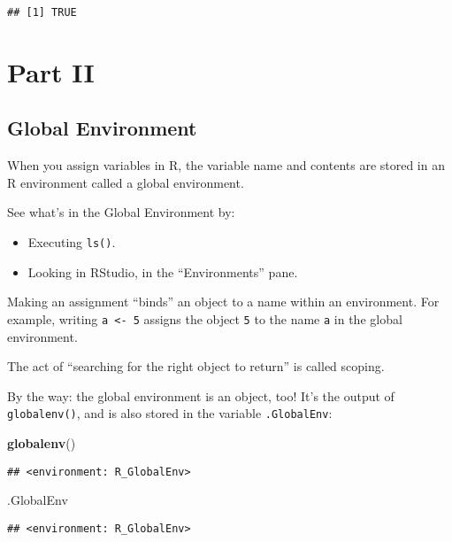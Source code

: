 \documentclass[]{article}
\newenvironment{Shaded}{\begin{snugshade}}{\end{snugshade}}
\newcommand{\KeywordTok}[1]{\textcolor[rgb]{0.13,0.29,0.53}{\textbf{#1}}}
\newcommand{\NormalTok}[1]{#1}
\providecommand{\tightlist}{%
  \setlength{\itemsep}{0pt}\setlength{\parskip}{0pt}}
\begin{document}
\begin{verbatim}
## [1] TRUE
\end{verbatim}

\section{Part II}\label{part-ii}

\subsection{Global Environment}\label{global-environment}

When you assign variables in R, the variable name and contents are
stored in an R environment called a global environment.

See what's in the Global Environment by:

\begin{itemize}
\tightlist
\item
  Executing \texttt{ls()}.
\item
  Looking in RStudio, in the ``Environments'' pane.
\end{itemize}

Making an assignment ``binds'' an object to a name within an
environment. For example, writing \texttt{a\ \textless{}-\ 5} assigns
the object \texttt{5} to the name \texttt{a} in the global environment.

The act of ``searching for the right object to return'' is called
scoping.

By the way: the global environment is an object, too! It's the output of
\texttt{globalenv()}, and is also stored in the variable
\texttt{.GlobalEnv}:

\begin{Shaded}
\begin{Highlighting}[]
\KeywordTok{globalenv}\NormalTok{()}
\end{Highlighting}
\end{Shaded}

\begin{verbatim}
## <environment: R_GlobalEnv>
\end{verbatim}

\begin{Shaded}
\begin{Highlighting}[]
\NormalTok{.GlobalEnv}
\end{Highlighting}
\end{Shaded}

\begin{verbatim}
## <environment: R_GlobalEnv>
\end{verbatim}
\end{document}
